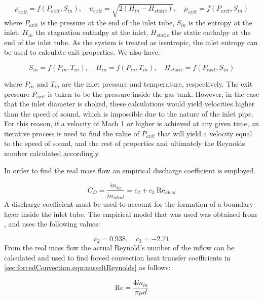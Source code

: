 \begin{equation}
\rho_{exit} =  f\left(P_{exit}, S_{in}\right), \quad u_{exit} = \sqrt{2\left(H_{in} - H_{static}\right)}, \quad\mu_{exit}= f\left(P_{exit}, S_{in}\right)
\end{equation}
where $P_{exit}$ is the pressure at the end of the inlet tube, $S_{in}$ is the entropy at the inlet, $H_{in}$ the stagnation enthalpy at the inlet, $H_{static}$ the static enthalpy at the end of the inlet tube. As the system is treated as isentropic, the inlet entropy can be used to calculate exit properties. We also have:

\begin{equation}
S_{in} = f\left( P_{in}, T_{in} \right), \quad H_{in} = f\left( P_{in}, T_{in} \right), \quad H_{static} = f\left( P_{exit}, S_{in} \right)
\end{equation}

\noindent where $P_{in}$ and $T_{in}$ are the inlet pressure and temperature, respectively. The exit pressure $P_{exit}$ is taken to be the pressure inside the gas tank. However, in the case that the inlet diameter is choked, these calculations would yield velocities higher than the speed of sound, which is impossible due to the nature of the inlet pipe. For this reason, if a velocity of Mach 1 or higher is achieved at any given time, an iterative process is used to find the value of $P_{exit}$ that will yield a velocity equal to the speed of sound, and the rest of properties and ultimately the Reynolds number calculated accordingly.

In order to find the real mass flow an empirical discharge coefficient is employed.

\begin{equation}
C_D = \frac{\dot{m}_{in}}{\dot{m}_{ideal}} = c_2+ c_3 \:\text{Re}_{ideal} 
\end{equation}
A discharge coefficient must be used to account for the formation of a boundary layer inside the inlet tube. The empirical model that was used was obtained from , and uses the following values:

\begin{equation}
c_2 =  0.938 ,  \quad c_3 = -2.71
\end{equation}
From the real mass flow the actual Reynold's number of the inflow can be calculated and used to find forced convection heat transfer coefficients in \cref{sec:forcedConvection,equ:nusseltReynolds} as follows: 

\begin{equation}
\text{Re} = \frac{4\dot m_{in}}{\pi \mu d}
\end{equation}


